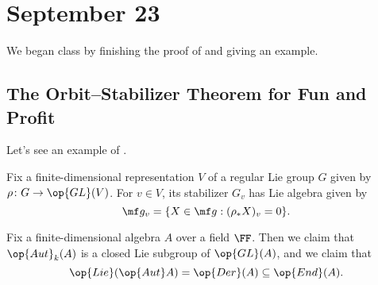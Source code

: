 \documentclass[../notes.tex]{subfiles}
\begin{document}
\section{September 23}
We began class by finishing the proof of  and giving an example.

\subsection{The Orbit--Stabilizer Theorem for Fun and Profit}
Let's see an example of .
\begin{example}
	Fix a finite-dimensional representation $V$ of a regular Lie group $G$ given by $\rho\colon G\to\op{GL}(V)$. For $v\in V$, its stabilizer $G_v$ has Lie algebra given by
	\[\mf g_v=\{X\in\mf g:(\rho_*X)_v=0\}.\]
\end{example}
\begin{example}
	Fix a finite-dimensional algebra $A$ over a field $\FF$. Then we claim that $\op{Aut}_k(A)$ is a closed Lie subgroup of $\op{GL}(A)$, and we claim that
	\[\op{Lie}(\op{Aut}A)=\op{Der}(A)\subseteq\op{End}(A).\]
\end{example}
\end{document}
